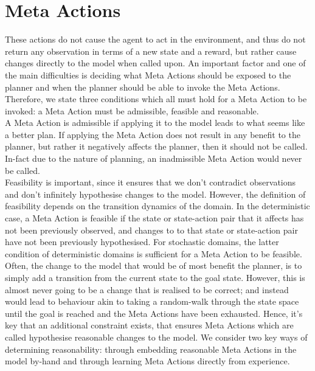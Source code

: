 \section{Meta Actions}
These actions do not cause the agent to act in the environment, and thus do not return any observation in terms of a new state and a reward, but rather cause changes directly to the model when called upon. An important factor and one of the main difficulties is deciding what Meta Actions should be exposed to the planner and when the planner should be able to invoke the Meta Actions. Therefore, we state three conditions which all must hold for a Meta Action to be invoked: a Meta Action must be admissible, feasible and reasonable.
\\A Meta Action is admissible if applying it to the model leads to what seems like a better plan. If applying the Meta Action does not result in any benefit to the planner, but rather it negatively affects the planner, then it should not be called. In-fact due to the nature of planning, an inadmissible Meta Action would never be called.\\Feasibility is important, since it ensures that we don't contradict observations and don't infinitely hypothesise changes to the model. However, the definition of feasibility depends on the transition dynamics of the domain. In the deterministic case, a Meta Action is feasible if the state or state-action pair that it affects has not been previously observed, and changes to to that state or state-action pair have not been previously hypothesised.
For stochastic domains, the latter condition of deterministic domains is sufficient for a Meta Action to be feasible.
\\Often, the change to the model that would be of most benefit the planner, is to simply add a transition from the current state to the goal state. However, this is almost never going to be a change that is realised to be correct; and instead would lead to behaviour akin to taking a random-walk through the state space until the goal is reached and the Meta Actions have been exhausted. Hence, it's key that an additional constraint exists, that ensures Meta Actions which are called hypothesise reasonable changes to the model. We consider two key ways of determining reasonability: through embedding reasonable Meta Actions in the model by-hand and through learning Meta Actions directly from experience.
